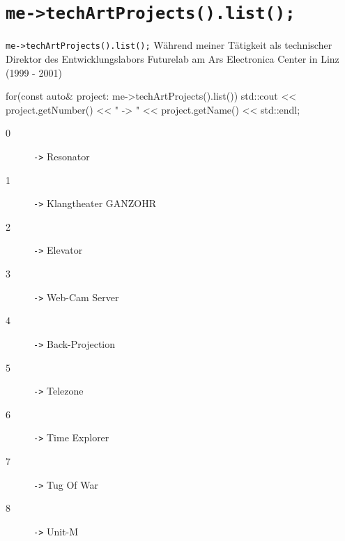 ﻿\nopartpage
\part{\tt{me->techArtProjects().list();}}
\withpartpage

\begin{frame}[t, fragile]{\tt{me->techArtProjects().list();}}
\vspace*{0.5em}%
   Während meiner Tätigkeit als technischer Direktor des Entwicklungslabors \alert{Futurelab} am \alert{Ars Electronica Center} in Linz (1999 - 2001)
  \begin{cppcode}[autogobble=true,captionpos=b,morekeywords={[2]project}]
    for(const auto& project: me->techArtProjects().list()) {
      std::cout << project.getNumber() << " -> " << project.getName() << std::endl;
    }
  \end{cppcode}
   \begin{description}
     \item[0] {\texttt{->}} Resonator
     \item[1] {\texttt{->}} Klangtheater GANZOHR
     \item[2] {\texttt{->}} Elevator
     \item[3] {\texttt{->}} Web-Cam Server
     \item[4] {\texttt{->}} Back-Projection
     \item[5] {\texttt{->}} Telezone
     \item[6] {\texttt{->}} Time Explorer
     \item[7] {\texttt{->}} Tug Of War
     \item[8] {\texttt{->}} Unit-M
   \end{description}
\end{frame}
